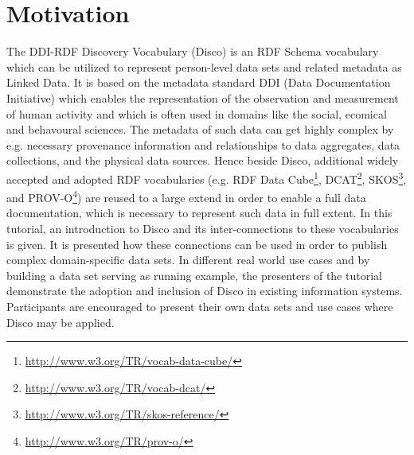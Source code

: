 \documentclass{llncs}
\begin{document}
%

\section{Motivation}
The DDI-RDF Discovery Vocabulary (Disco) \cite{Bosch2012} is an RDF Schema vocabulary which can be utilized to represent person-level data sets and related metadata as Linked Data. 
It is based on the metadata standard DDI (Data Documentation Initiative) which enables the representation of the observation and measurement of human activity and which is often used in domains like the social, ecomical and behavoural sciences. 
The metadata of such data can get highly complex by e.g. necessary provenance information and relationships to data aggregates, data collections, and the physical data sources.
Hence beside Disco, additional widely accepted and adopted RDF vocabularies (e.g. RDF Data Cube\footnote{\url{http://www.w3.org/TR/vocab-data-cube/}}, DCAT\footnote{\url{http://www.w3.org/TR/vocab-dcat/}}, SKOS\footnote{\url{http://www.w3.org/TR/skos-reference/}}, and PROV-O\footnote{\url{http://www.w3.org/TR/prov-o/}}) are reused to a large extend \cite{Bosch2013} in order to enable a full data documentation, which is necessary to represent such data in full extent. 
In this tutorial, an introduction to Disco and its inter-connections to these vocabularies is given. 
It is presented how these connections can be used in order to publish complex domain-specific data sets.
In different real world use cases and by building a data set serving as running example, the presenters of the tutorial demonstrate the adoption and inclusion of Disco in existing information systems.
Participants are encouraged to present their own data sets and use cases where Disco may be applied. 
\end{document}
